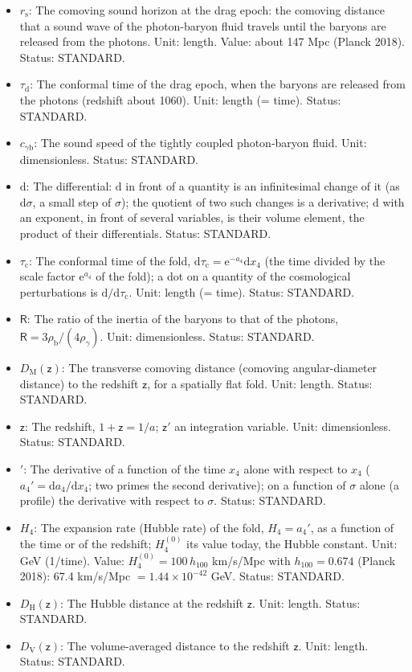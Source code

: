 \documentclass[
  10pt,
]{article}
\providecommand{\tightlist}{%
  \setlength{\itemsep}{0pt}\setlength{\parskip}{0pt}}
\begin{document}
\begin{itemize}
\tightlist
\item
  \(r_{\mathrm{s}}\): The comoving sound horizon at the drag epoch: the
  comoving distance that a sound wave of the photon-baryon fluid travels
  until the baryons are released from the photons. Unit: length. Value:
  about 147 Mpc (Planck 2018). Status: STANDARD.
\item
  \(\tau_{\mathrm{d}}\): The conformal time of the drag epoch, when the
  baryons are released from the photons (redshift about 1060). Unit:
  length (= time). Status: STANDARD.
\item
  \(c_{\gamma\mathrm{b}}\): The sound speed of the tightly coupled
  photon-baryon fluid. Unit: dimensionless. Status: STANDARD.
\item
  \(\mathrm{d}\): The differential: \(\mathrm{d}\) in front of a
  quantity is an infinitesimal change of it (as \(\mathrm{d}\sigma\), a
  small step of \(\sigma\)); the quotient of two such changes is a
  derivative; \(\mathrm{d}\) with an exponent, in front of several
  variables, is their volume element, the product of their
  differentials. Status: STANDARD.
\item
  \(\tau_{\mathrm{c}}\): The conformal time of the fold,
  \(\mathrm{d}\tau_{\mathrm{c}} = \mathrm{e}^{-a_4}\mathrm{d}x_4\) (the
  time divided by the scale factor \(\mathrm{e}^{a_4}\) of the fold); a
  dot on a quantity of the cosmological perturbations is
  \(\mathrm{d}/\mathrm{d}\tau_{\mathrm{c}}\). Unit: length (= time).
  Status: STANDARD.
\item
  \(\mathsf{R}\): The ratio of the inertia of the baryons to that of the
  photons, \(\mathsf{R} = 3\rho_{\mathrm{b}}/(4\rho_\gamma)\). Unit:
  dimensionless. Status: STANDARD.
\item
  \(D_{\mathrm{M}}(\mathsf{z})\): The transverse comoving distance
  (comoving angular-diameter distance) to the redshift \(\mathsf{z}\),
  for a spatially flat fold. Unit: length. Status: STANDARD.
\item
  \(\mathsf{z}\): The redshift, \(1 + \mathsf{z} = 1/a\);
  \(\mathsf{z}'\) an integration variable. Unit: dimensionless. Status:
  STANDARD.
\item
  \({}'\): The derivative of a function of the time \(x_4\) alone with
  respect to \(x_4\) (\(a_4' = \mathrm{d}a_4/\mathrm{d}x_4\); two primes
  the second derivative); on a function of \(\sigma\) alone (a profile)
  the derivative with respect to \(\sigma\). Status: STANDARD.
\item
  \(H_4\): The expansion rate (Hubble rate) of the fold, \(H_4 = a_4'\),
  as a function of the time or of the redshift; \(H_4^{(0)}\) its value
  today, the Hubble constant. Unit: GeV (1/time). Value:
  \(H_4^{(0)} = 100\,h_{100}\) km/s/Mpc with \(h_{100} = 0.674\) (Planck
  2018): 67.4 km/s/Mpc \(= 1.44\times10^{-42}\) GeV. Status: STANDARD.
\item
  \(D_{\mathrm{H}}(\mathsf{z})\): The Hubble distance at the redshift
  \(\mathsf{z}\). Unit: length. Status: STANDARD.
\item
  \(D_{\mathrm{V}}(\mathsf{z})\): The volume-averaged distance to the
  redshift \(\mathsf{z}\). Unit: length. Status: STANDARD.
\end{itemize}
\end{document}
